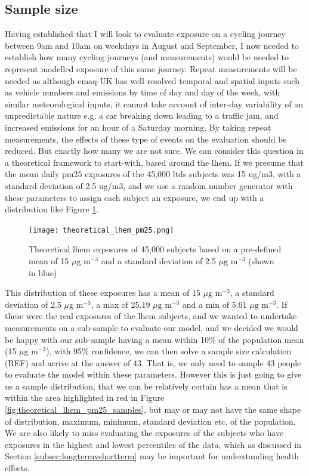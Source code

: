 \subsection{Sample size}
\label{subsec:samplesize}

Having established that I will look to evaluate exposure on a cycling journey between 9am and 10am on weekdays in August and September, I now needed to establish how many cycling journeys (and measurements) would be needed to represent modelled exposure of this same journey. Repeat measurements will be needed as although \gls{cmaq}-UK has well resolved temporal and spatial inputs such as vehicle numbers and emissions by time of day and day of the week, with similar meteorological inputs, it cannot take account of inter-day variability of an unpredictable nature e.g. a car breaking down leading to a traffic jam, and increased emissions for an hour of a Saturday morning. By taking repeat measurements, the effects of these type of events on the evaluation should be reduced. But exactly how many we are not sure. 
We can consider this question in a theoretical framework to start-with, based around the \gls{lhem}. If we presume that the mean daily \gls{pm25} exposures of the 45,000 \gls{ltds} subjects was 15 ug/m3, with a standard deviation of 2.5 ug/m3, and we use a random number generator with these parameters to assign each subject an exposure, we end up with a distribution like Figure \ref{fig:theoretical_lhem_pm25}.

\begin{figure}[H]
\centering
\texttt{[image: theoretical\_lhem\_pm25.png]}
\caption{Theoretical \gls{lhem} exposures of 45,000 subjects based on a pre-defined mean of 15 $\mu \text{g m}^{-3}$ and a standard deviation of 2.5 $\mu \text{g m}^{-3}$ (shown in blue)}
\label{fig:theoretical_lhem_pm25}
\end{figure}

This distribution of these exposures has a mean of 15 $\mu \text{g m}^{-3}$, a standard deviation of 2.5 $\mu \text{g m}^{-3}$, a max of 25.19 $\mu \text{g m}^{-3}$ and a min of 5.61 $\mu \text{g m}^{-3}$. If these were the real exposures of the \gls{lhem} subjects, and we wanted to undertake measurements on a sub-sample to evaluate our model, and we decided we would be happy with our sub-sample having a mean within 10\% of the population mean (15 $\mu \text{g m}^{-3}$), with 95\% confidence, we can then solve a sample size calculation (REF) and arrive at the answer of 43. That is, we only need to sample 43 people to evaluate the model within these parameters.  However this is just going to give us a sample distribution, that we can be relatively certain has a mean that is within the area highlighted in red in Figure \ref{fig:theoretical_lhem_pm25_samples}, but may or may not have the same shape of distribution, maximum, minimum, standard deviation etc. of the population. We are also likely to miss evaluating the exposures of the subjects who have exposures in the highest and lowest percentiles of the data, which as discussed in Section \ref{subsec:longtermvshortterm} may be important for understanding health effects.

